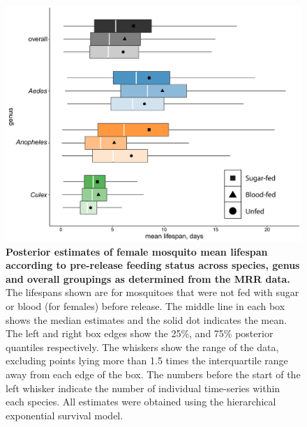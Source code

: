 \documentclass[12pt]{article}
\begin{document}
{\begin{figure}[h]
	\centerline{\includegraphics[width=1\textwidth]{./Figure_files/mrr_female_blood_sugar.pdf}}
	\caption{\textbf{Posterior estimates of female mosquito mean lifespan according to pre-release feeding status across species, genus and overall groupings as determined from the MRR data.} The lifespans shown are for mosquitoes that were not fed with sugar or blood (for females) before release. The middle line in each box shows the median estimates and the solid dot indicates the mean. The left and right box edges show the 25\%, and 75\% posterior quantiles respectively. The whiskers show the range of the data, excluding points lying more than 1.5 times the interquartile range away from each edge of the box. The numbers before the start of the left whisker indicate the number of individual time-series within each species. All estimates were obtained using the hierarchical exponential survival model.}
	\label{fig:mrr_female_blood_sugar}
\end{figure}

}
\end{document}
